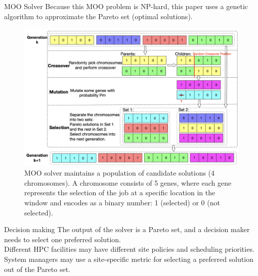 \documentclass[aspectratio=1610]{beamer}
\begin{document}
\begin{frame}{MOO Solver}
    Because this MOO problem is NP-hard, this paper uses a genetic algorithm to approximate the Pareto set (optimal solutions). \\
    \begin{figure}
        \begin{center}
            \includegraphics[keepaspectratio, scale=0.18]{pic/genetic.png}
            \caption{MOO solver maintains a population of candidate solutions (4 chromosomes). 
            A chromosome consists of 5 genes, where each gene represents the selection of the job at a specific location in the window and encodes as a binary number: 1 (selected) or 0 (not selected).}
            \label{fig:Genetic_Algorithm}
        \end{center}
    \end{figure}
\end{frame}

\begin{frame}{Decision making}
    The output of the solver is a Pareto set, and a decision maker needs to select one preferred solution. \\
    \vspace{10pt}
    Different HPC facilities may have different site policies and scheduling priorities. \\
    \vspace{10pt}
    System managers may use a site-specific metric for selecting a preferred solution out of the Pareto set. 
\end{frame}
\end{document}
